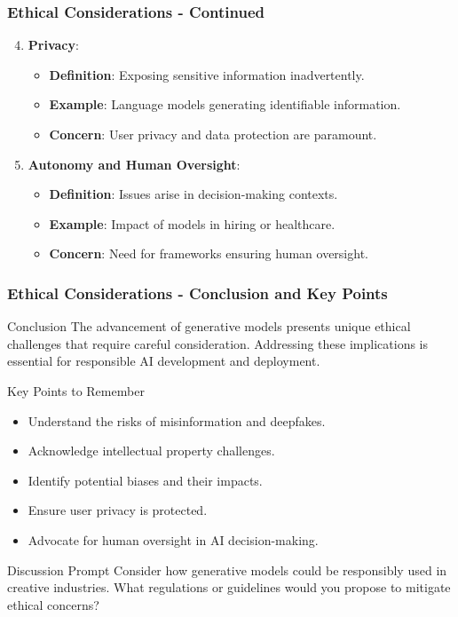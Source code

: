 \documentclass[aspectratio=169]{beamer}
\begin{document}
\begin{frame}[fragile]
    \frametitle{Ethical Considerations - Continued}
    \begin{enumerate}
        \setcounter{enumi}{3}
        
        \item \textbf{Privacy}:
            \begin{itemize}
                \item \textbf{Definition}: Exposing sensitive information inadvertently.
                \item \textbf{Example}: Language models generating identifiable information.
                \item \textbf{Concern}: User privacy and data protection are paramount.
            \end{itemize}
        
        \item \textbf{Autonomy and Human Oversight}:
            \begin{itemize}
                \item \textbf{Definition}: Issues arise in decision-making contexts.
                \item \textbf{Example}: Impact of models in hiring or healthcare.
                \item \textbf{Concern}: Need for frameworks ensuring human oversight.
            \end{itemize}
    \end{enumerate}
\end{frame}

\begin{frame}[fragile]
    \frametitle{Ethical Considerations - Conclusion and Key Points}
    \begin{block}{Conclusion}
        The advancement of generative models presents unique ethical challenges that require careful consideration. Addressing these implications is essential for responsible AI development and deployment.
    \end{block}

    \begin{block}{Key Points to Remember}
        \begin{itemize}
            \item Understand the risks of misinformation and deepfakes.
            \item Acknowledge intellectual property challenges.
            \item Identify potential biases and their impacts.
            \item Ensure user privacy is protected.
            \item Advocate for human oversight in AI decision-making.
        \end{itemize}
    \end{block}

    \begin{block}{Discussion Prompt}
        Consider how generative models could be responsibly used in creative industries. What regulations or guidelines would you propose to mitigate ethical concerns?
    \end{block}
\end{frame}
\end{document}
